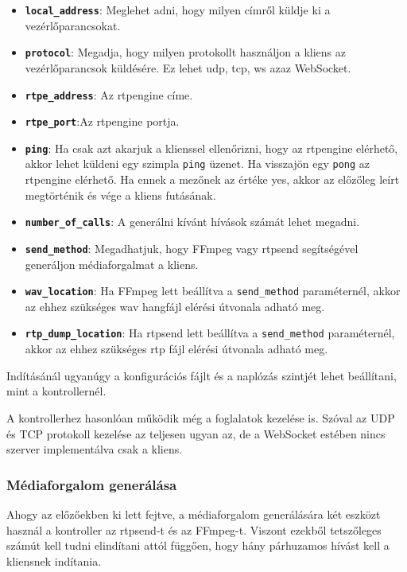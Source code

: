 \begin{itemize}
	\item \textbf{\texttt{local\_address}}: Meglehet adni, hogy milyen címről küldje
	ki a vezérlőparancsokat.
	\item \textbf{\texttt{protocol}}: Megadja, hogy milyen protokollt használjon a kliens 
	az vezérlőparancsok küldésére. Ez lehet udp, tcp, ws azaz WebSocket.
	\item \textbf{\texttt{rtpe\_address}}: Az rtpengine címe. 
	\item \textbf{\texttt{rtpe\_port}}:Az rtpengine portja.
	\item \textbf{\texttt{ping}}: Ha csak azt akarjuk a klienssel ellenőrizni, hogy az 
	rtpengine elérhető, akkor lehet küldeni egy szimpla \texttt{ping} üzenet. Ha 
	visszajön egy \texttt{pong} az rtpengine elérhető. Ha ennek a mezőnek az értéke yes, 
	akkor az előzőleg leírt megtörténik és vége a kliens futásának. 
	\item \textbf{\texttt{number\_of\_calls}}: A generálni kívánt hívások számát lehet 
	megadni. 
	\item \textbf{\texttt{send\_method}}: Megadhatjuk, hogy FFmpeg vagy rtpsend 
	segítségével generáljon médiaforgalmat a kliens.
	\item \textbf{\texttt{wav\_location}}: Ha FFmpeg lett beállítva a 
	\texttt{send\_method} paraméternél, akkor az ehhez szükséges wav hangfájl elérési 
	útvonala adható meg.
	\item \textbf{\texttt{rtp\_dump\_location}}: Ha rtpsend lett beállítva a 
	\texttt{send\_method} paraméternél, akkor az ehhez szükséges rtp fájl elérési 
	útvonala adható meg.
\end{itemize}

Indításánál ugyanúgy a konfigurációs fájlt és a naplózás szintjét lehet beállítani,
mint a kontrollernél. 

A kontrollerhez hasonlóan működik még a foglalatok kezelése is. Szóval az UDP és TCP 
protokoll kezelése az teljesen ugyan az, de a WebSocket estében nincs szerver 
implementálva csak a kliens. 

\subsubsection{Médiaforgalom generálása}

Ahogy az előzőekben ki lett fejtve, a médiaforgalom generálására két eszközt 
használ a kontroller az rtpsend-t és az FFmpeg-t. Viszont ezekből tetszőleges
számút kell tudni elindítani attól függően, hogy hány párhuzamos hívást kell 
a kliensnek indítania.

